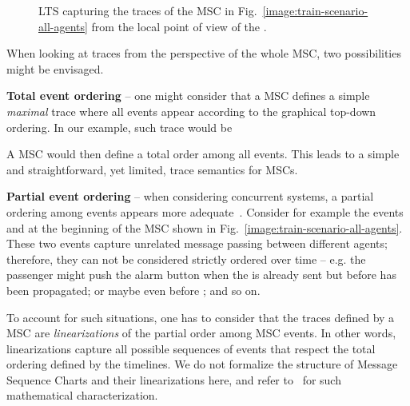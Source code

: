 \vspace{0.5cm}
\begin{figure}[H]\centering
{}
\caption{LTS capturing the traces of the MSC in Fig.~\ref{image:train-scenario-all-agents} from the local point of view of the .\label{image:local-traces-lts}}
\end{figure}

When looking at traces from the perspective of the whole MSC, two possibilities might be envisaged.

\noindent \textbf{Total event ordering} -- one might consider that a MSC defines a simple \emph{maximal} trace where all events appear according to the graphical top-down ordering. In our example, such trace would be

\begin{center}\end{center} 

A MSC would then define a total order among all events. This leads to a simple and straightforward, yet limited, trace semantics for MSCs.

\noindent \textbf{Partial event ordering} -- when considering concurrent systems, a partial ordering among events appears more adequate~\cite{ITU:1996, Uchitel:2003}. Consider for example the events  and  at the beginning of the MSC shown in Fig.~\ref{image:train-scenario-all-agents}. These two events capture unrelated message passing between different agents; therefore, they can not be considered strictly ordered over time -- e.g. the passenger might push the alarm button when the  is already sent but before  has been propagated; or maybe even before ; and so on. 

To account for such situations, one has to consider that the traces defined by a MSC are \emph{linearizations} of the partial order among MSC events. In other words, linearizations capture all possible sequences of events that respect the total ordering defined by the timelines. We do not formalize the structure of Message Sequence Charts and their linearizations here, and refer to~\cite{Uchitel:2003} for such mathematical characterization. 

